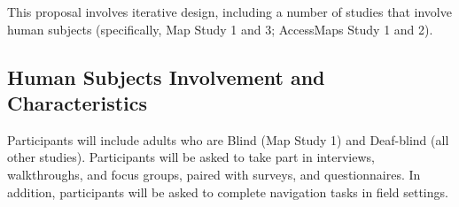 

This proposal involves iterative design, including a number of studies that involve human subjects (specifically, Map Study 1 and 3; AccessMaps Study 1 and 2). 

\subsection{Human Subjects Involvement and Characteristics}

Participants will include adults who are Blind (Map Study 1) and Deaf-blind (all other studies). Participants will be asked to take part in interviews, walkthroughs, and focus groups, paired with surveys, and questionnaires. In addition, participants will be asked to complete navigation tasks in field settings. 

